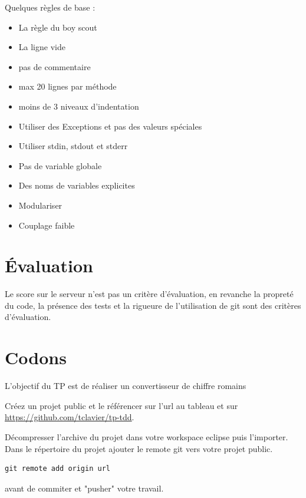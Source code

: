 \documentclass[a4paper]{article}
\begin{document}
Quelques règles de base : 
\begin{itemize}
  \item La règle du boy scout
  \item La ligne vide 
  \item pas de commentaire
  \item max 20 lignes par méthode
  \item moins de 3 niveaux d'indentation
  \item Utiliser des Exceptions et pas des valeurs spéciales
  \item Utiliser stdin, stdout et stderr
  \item Pas de variable globale
  \item Des noms de variables explicites
  \item Modulariser
  \item Couplage faible
\end{itemize}

\section*{Évaluation}
Le score sur le serveur n'est pas un critère d'évaluation, en revanche la propreté du code, la présence des tests et la rigueure de l'utilisation de git sont des critères d'évaluation.

\section*{Codons}
L’objectif du TP est de réaliser un convertisseur de chiffre romains

Créez un projet public et le référencer sur l'url au tableau et sur \url{https://github.com/tclavier/tp-tdd}.

Décompresser l’archive du projet dans votre workspace eclipse puis l’importer.
Dans le répertoire du projet ajouter le remote git vers votre projet public.
\begin{verbatim}
git remote add origin url
\end{verbatim}
avant de commiter et "pusher" votre travail.
\end{document}
